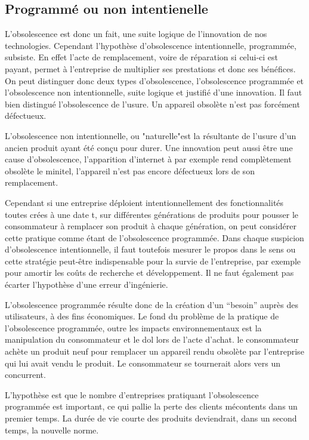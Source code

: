 \subsection{Programmé ou non intentienelle}


L'obsolescence est donc un fait, une suite logique de l'innovation de nos technologies. Cependant l'hypothèse d'obsolescence intentionnelle, programmée, subsiste. En effet l'acte de remplacement, voire de réparation si celui-ci est payant, permet à l'entreprise de multiplier ses prestations et donc ses bénéfices. On peut distinguer donc deux types d'obsolescence, l'obsolescence programmée et l'obsolescence non intentionnelle, suite logique et justifié d’une innovation. Il faut bien distingué l’obsolescence de l’usure. Un appareil obsolète n’est pas forcément défectueux.

L'obsolescence non intentionnelle, ou "naturelle"est la résultante de l'usure d'un ancien produit ayant été conçu pour durer.  Une innovation peut aussi être une cause d'obsolescence, l’apparition d’internet à par exemple rend complètement obsolète le minitel, l’appareil n’est pas encore défectueux lors de son remplacement.

Cependant si une entreprise déploient intentionnellement des fonctionnalités toutes crées à une date t, sur différentes générations de produits pour pousser le consommateur à remplacer son produit à chaque génération, on peut considérer cette pratique comme étant de l'obsolescence programmée. Dans chaque suspicion d’obsolescence intentionnelle, il faut toutefois mesurer le propos dans le sens ou cette stratégie peut-être indispensable pour la survie de l’entreprise, par exemple pour amortir les coûts de recherche et développement. Il ne faut également pas écarter l’hypothèse d’une erreur d'ingénierie.

L'obsolescence programmée résulte donc de la création d'un “besoin” auprès des utilisateurs, à des fins économiques. Le fond du problème de la pratique de l'obsolescence programmée, outre les impacts environnementaux est la manipulation du consommateur et le dol lors de l'acte d'achat. le consommateur achète un produit neuf pour remplacer un appareil rendu obsolète par l'entreprise qui lui avait vendu le produit. Le consommateur se tournerait alors vers un concurrent.

L’hypothèse est que le nombre d’entreprises pratiquant l’obsolescence programmée est important, ce qui pallie la perte des clients mécontents dans un premier temps. La durée de vie courte des produits deviendrait, dans un second temps, la nouvelle norme.
